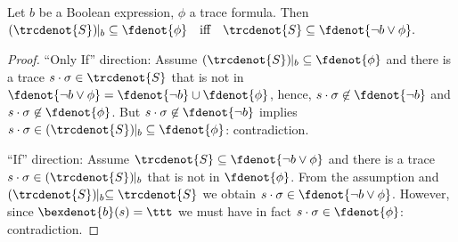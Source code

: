 \documentclass[a4paper,numberwithinsect]{lipics-v2021}
\begin{document}
\begin{proposition}
  \label{prop:state-judge}
  Let $b$ be a Boolean expression, $\phi$ a trace formula. Then
  $
    (\trcdenot{S})\!\!\mid_b\; \subseteq \fdenot{\phi}
    \quad\text{iff}\quad
    \trcdenot{S} \subseteq \fdenot{\lnot b\lor\phi}.
  $  
\end{proposition}

\begin{proof}%
  ``Only If'' direction:
  Assume $(\trcdenot{S})\!\!\mid_b\;\subseteq \fdenot{\phi}$ and there
  is a trace $s\cdot\sigma\in\trcdenot{S}$ that is not in
  $\fdenot{\lnot b\lor\phi}=\fdenot{\lnot b}\cup\fdenot{\phi}$, hence,
  $s\cdot\sigma\not\in\fdenot{\lnot b}$ and
  $s\cdot\sigma\not\in\fdenot{\phi}$. But
  $s\cdot\sigma\not\in\fdenot{\lnot b}$ implies
  $s\cdot\sigma\in(\trcdenot{S})\!\!\mid_b\;\subseteq\fdenot{\phi}$:
  contradiction.

  ``If'' direction:
  Assume $\trcdenot{S} \subseteq \fdenot{\lnot b\lor\phi}$ and there
  is a trace $s\cdot\sigma\in(\trcdenot{S})\!\!\mid_b$ that is not in
  $\fdenot{\phi}$. From the assumption and
  $(\trcdenot{S})\!\!\mid_b\subseteq\trcdenot{S}$ we obtain
  $s\cdot\sigma\in\fdenot{\lnot b\lor\phi}$.  However, since
  $\bexdenot{b} (s) = \ttt$ we must have in fact
  $s\cdot\sigma\in\fdenot{\phi}$: contradiction.
\end{proof}
\end{document}
